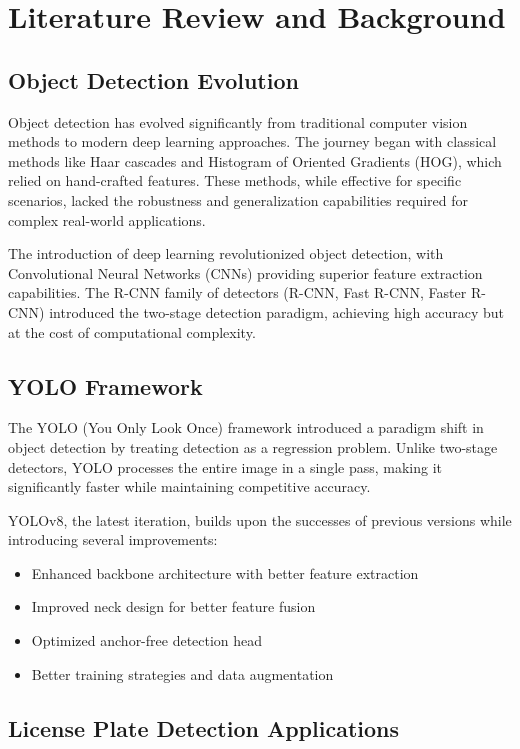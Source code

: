 \documentclass[12pt,a4paper]{article}
\begin{document}
\section{Literature Review and Background}

\subsection{Object Detection Evolution}

Object detection has evolved significantly from traditional computer vision methods to modern deep learning approaches. The journey began with classical methods like Haar cascades and Histogram of Oriented Gradients (HOG), which relied on hand-crafted features. These methods, while effective for specific scenarios, lacked the robustness and generalization capabilities required for complex real-world applications.

The introduction of deep learning revolutionized object detection, with Convolutional Neural Networks (CNNs) providing superior feature extraction capabilities. The R-CNN family of detectors (R-CNN, Fast R-CNN, Faster R-CNN) introduced the two-stage detection paradigm, achieving high accuracy but at the cost of computational complexity.

\subsection{YOLO Framework}

The YOLO (You Only Look Once) framework introduced a paradigm shift in object detection by treating detection as a regression problem. Unlike two-stage detectors, YOLO processes the entire image in a single pass, making it significantly faster while maintaining competitive accuracy.

YOLOv8, the latest iteration, builds upon the successes of previous versions while introducing several improvements:

\begin{itemize}
    \item Enhanced backbone architecture with better feature extraction
    \item Improved neck design for better feature fusion
    \item Optimized anchor-free detection head
    \item Better training strategies and data augmentation
\end{itemize}

\subsection{License Plate Detection Applications}
\end{document}

